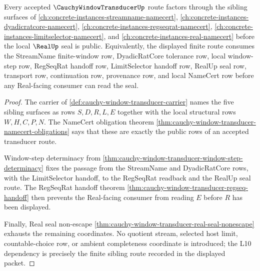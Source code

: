 \begin{theorem}
\label{thm:cauchy-window-transducer-l10-lattice-link}
Every accepted $\CauchyWindowTransducerUp$ route factors through the sibling surfaces of \autoref{ch:concrete-instances-streamname-namecert}, \autoref{ch:concrete-instances-dyadicratcore-namecert}, \autoref{ch:concrete-instances-regseqrat-namecert}, \autoref{ch:concrete-instances-limitselector-namecert}, and \autoref{ch:concrete-instances-real-namecert} before the local $\RealUp$ seal is public. Equivalently, the displayed finite route consumes the StreamName finite-window row, DyadicRatCore tolerance row, local window-step row, RegSeqRat handoff row, LimitSelector handoff row, RealUp seal row, transport row, continuation row, provenance row, and local NameCert row before any Real-facing consumer can read the seal.
\end{theorem}
\begin{proof}
The carrier of \autoref{def:cauchy-window-transducer-carrier} names the five sibling surfaces as rows $S,D,R,L,E$ together with the local structural rows $W,H,C,P,N$. The NameCert obligation theorem \autoref{thm:cauchy-window-transducer-namecert-obligations} says that these are exactly the public rows of an accepted transducer route.

Window-step determinacy from \autoref{thm:cauchy-window-transducer-window-step-determinacy} fixes the passage from the StreamName and DyadicRatCore rows, with the LimitSelector handoff, to the RegSeqRat readback and the RealUp seal route. The RegSeqRat handoff theorem \autoref{thm:cauchy-window-transducer-regseq-handoff} then prevents the Real-facing consumer from reading $E$ before $R$ has been displayed.

Finally, Real seal non-escape \autoref{thm:cauchy-window-transducer-real-seal-nonescape} exhausts the remaining coordinates. No quotient stream, selected host limit, countable-choice row, or ambient completeness coordinate is introduced; the L10 dependency is precisely the finite sibling route recorded in the displayed packet.
\end{proof}



